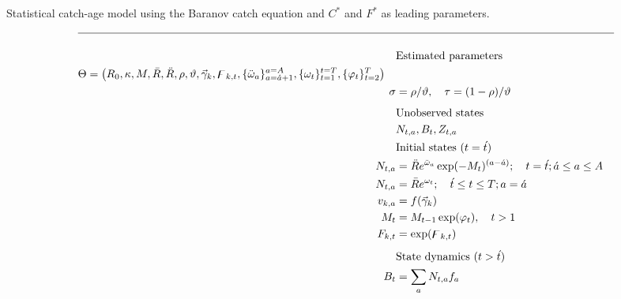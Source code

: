 \begin{table}[!tpb]
  \centering
\caption{Statistical catch-age model using the Baranov catch
equation and $C^*$ and $F^*$ as leading parameters.}\label{Table4}
\tableEq
    \begin{align}
        \hline \nonumber \\
        &\mbox{Estimated parameters} \nonumber\\
        \begin{split}
        \Theta&= 
        		\left(R_0,\kappa,M,\bar{R},\ddot{R},\rho,\vartheta,
		\vec{\gamma}_{k}
				,\digamma_{k,t}, %
		 \{\ddot{\omega}_a\}_{a=\acute{a}+1}^{a=A},
		 \{\omega_t\}_{t=1}^{t=T},
        		\{\varphi_t \}_{t=2}^T\right)
	\end{split} \label{T4.1}\\
        \sigma&=\rho /\vartheta, \quad
        \tau=(1-\rho)/\vartheta\label{T4.2}\\[1ex]
        &\mbox{Unobserved states} \nonumber\\
        &N_{t,a},B_t,Z_{t,a}	\label{T4.3}\\
        &\mbox{Initial states ($t=\acute{t}$)} \nonumber\\
        N_{t,a}&=\ddot{R}e^{\ddot{\omega}_{a}} \exp(-M_t)^{(a-\acute{a})};
        	\quad t=\acute{t};  \acute{a}\leq a\leq A \label{T4.4}\\
        N_{t,a}&=\bar{R}e^{\omega_{t}} ;\quad \acute{t}\leq t\leq T;  
        	a=\acute{a} \label{T4.5}\\
        v_{k,a}&=f(\vec{\gamma}_k) \label{T4.6}\\
        M_t &= M_{t-1} \exp(\varphi_t), \quad t>1 \label{T4.6b}\\
        F_{k,t}&= \exp(\digamma_{k,t}) \label{T4.7}\\[1ex]
        &\mbox{State dynamics ($t>\acute{t}$)} \nonumber\\
        B_t&=\sum_a N_{t,a}f_a \label{T4.8}\\

\end{align}
\end{table}
